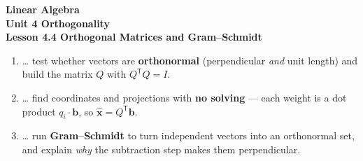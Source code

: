 \documentclass[10pt]{article}
\begin{document}
\vspace{-0.8in}

\begin{center}
  {\color{white}\textbf{\LARGE Linear Algebra}}\\[4pt]
  {\color{blushmid}\large\textbf{Unit 4 \quad Orthogonality}}\\[6pt]
  {\color{white}\textbf{\large Lesson 4.4 \quad Orthogonal Matrices and Gram--Schmidt}}
\end{center}

\vspace{0.22in}
\namedateperiod
\vspace{0.18in}

\begin{learningtargetbox}
\small
\begin{enumerate}[leftmargin=1.5em, itemsep=5pt]
  \item \ldots{} test whether vectors are \textbf{orthonormal} (perpendicular \emph{and} unit length) and build the matrix $Q$ with $Q^{\mathsf{T}}Q=I$.
  \item \ldots{} find coordinates and projections with \textbf{no solving} --- each weight is a dot product $q_i\cdot\mathbf{b}$, so $\hat{\mathbf{x}}=Q^{\mathsf{T}}\mathbf{b}$.
  \item \ldots{} run \textbf{Gram--Schmidt} to turn independent vectors into an orthonormal set, and explain \emph{why} the subtraction step makes them perpendicular.
\end{enumerate}
\end{learningtargetbox}

\vspace{0.14in}
\end{document}

